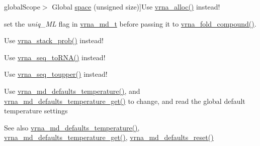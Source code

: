 \begin{DoxyRefList}
\hypertarget{deprecated__deprecated000150}{}%
global\+Scope$>$ Global \hyperlink{utils_8h_ad7e1e137b3bf1f7108933d302a7f0177}{space} (unsigned size)]Use \hyperlink{group__utils_gaf37a0979367c977edfb9da6614eebe99}{vrna\+\_\+alloc()} instead!  
\item[\label{deprecated__deprecated000093}%
\hypertarget{deprecated__deprecated000093}{}%
global\+Scope$>$ Global \hyperlink{group__subopt__stochbt_gacd79b1a570e6ad9be24cb11fe8cae30a}{st\+\_\+back} ]set the {\itshape uniq\+\_\+\+M\+L} flag in \hyperlink{group__model__details_ga1f8a10e12a0a1915f2a4eff0b28ea17c}{vrna\+\_\+md\+\_\+t} before passing it to \hyperlink{group__fold__compound_ga6601d994ba32b11511b36f68b08403be}{vrna\+\_\+fold\+\_\+compound()}. 
\item[\label{deprecated__deprecated000102}%
\hypertarget{deprecated__deprecated000102}{}%
global\+Scope$>$ Global \hyperlink{part__func_8h_ae856dd7a8d75c471c07153882bf1db48}{stack\+Prob} (double cutoff)]Use \hyperlink{group__pf__fold_ga26e3cc2eb127a35625572e9275c24ee4}{vrna\+\_\+stack\+\_\+prob()} instead!  
\item[\label{deprecated__deprecated000125}%
\hypertarget{deprecated__deprecated000125}{}%
global\+Scope$>$ Global \hyperlink{string__utils_8h_ad3f18dd83f958f18b2f26ecb99305208}{str\+\_\+\+D\+N\+A2\+R\+N\+A} (char $\ast$sequence)]Use \hyperlink{group__string__utils_gacfed92cba77064f6c743f9118d079bfc}{vrna\+\_\+seq\+\_\+to\+R\+N\+A()} instead!  
\item[\label{deprecated__deprecated000124}%
\hypertarget{deprecated__deprecated000124}{}%
global\+Scope$>$ Global \hyperlink{string__utils_8h_a17b796b806f96b70382077fb5bc519bb}{str\+\_\+uppercase} (char $\ast$sequence)]Use \hyperlink{group__string__utils_ga4f44dca03c9d708d68e64c0610bb9091}{vrna\+\_\+seq\+\_\+toupper()} instead!  
\item[\label{deprecated__deprecated000081}%
\hypertarget{deprecated__deprecated000081}{}%
global\+Scope$>$ Global \hyperlink{group__model__details_gab4b11c8d9c758430960896bc3fe82ead}{temperature} ]Use \hyperlink{group__model__details_gaf9e527e9a2f7e6fd6e42bc6e602f5445}{vrna\+\_\+md\+\_\+defaults\+\_\+temperature()}, and \hyperlink{group__model__details_ga96b24a74437f9ba46c4e06343155bf46}{vrna\+\_\+md\+\_\+defaults\+\_\+temperature\+\_\+get()} to change, and read the global default temperature settings \begin{DoxySeeAlso}{See also}
\hyperlink{group__model__details_gaf9e527e9a2f7e6fd6e42bc6e602f5445}{vrna\+\_\+md\+\_\+defaults\+\_\+temperature()}, \hyperlink{group__model__details_ga96b24a74437f9ba46c4e06343155bf46}{vrna\+\_\+md\+\_\+defaults\+\_\+temperature\+\_\+get()}, \hyperlink{group__model__details_ga70834424cf804d149937de89f80ceb45}{vrna\+\_\+md\+\_\+defaults\+\_\+reset()}  
\end{DoxySeeAlso}


\end{DoxyRefList}
